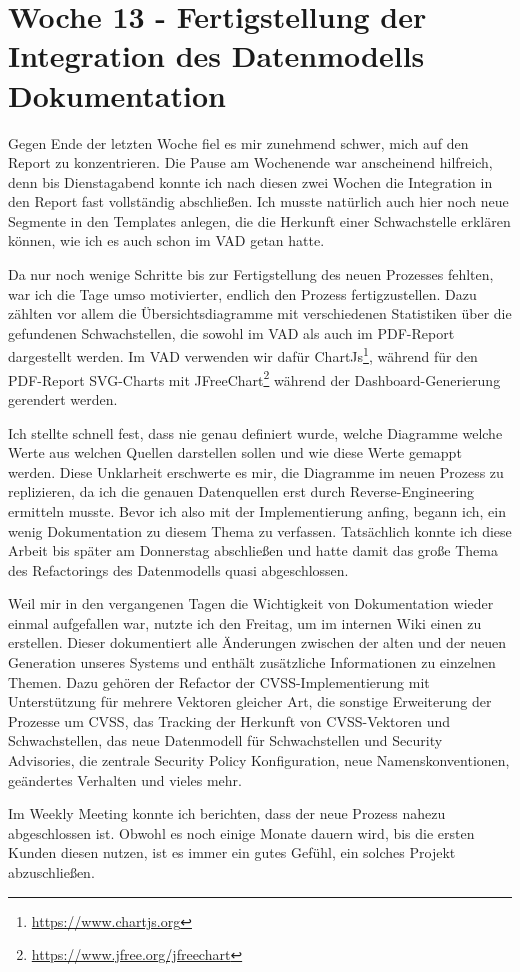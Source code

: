 \section{Woche 13 - Fertigstellung der Integration des Datenmodells \headerand Dokumentation} \label{sec:bericht-wo-13-initial}


\lweekdaymarginpar{\weekdayMondayShort, \weekdayTuesdayShort}

Gegen Ende der letzten Woche fiel es mir zunehmend schwer, mich auf den Report zu konzentrieren.
Die Pause am Wochenende war anscheinend hilfreich, denn bis Dienstagabend konnte ich nach diesen zwei Wochen die Integration in den Report fast vollständig abschließen.
Ich musste natürlich auch hier noch neue Segmente in den Templates anlegen, die die Herkunft einer Schwachstelle erklären können, wie ich es auch schon im VAD getan hatte.

\sweekdaymarginpar{\weekdayWednesdayShort, \weekdayThursdayShort}

Da nur noch wenige Schritte bis zur Fertigstellung des neuen Prozesses fehlten, war ich die Tage umso motivierter, endlich den Prozess fertigzustellen.
Dazu zählten vor allem die Übersichtsdiagramme mit verschiedenen Statistiken über die gefundenen Schwachstellen, die sowohl im VAD als auch im PDF-Report dargestellt werden.
Im VAD verwenden wir dafür ChartJs\footnote{\url{https://www.chartjs.org}}, während für den PDF-Report SVG-Charts mit JFreeChart\footnote{\url{https://www.jfree.org/jfreechart}} während der Dashboard-Generierung gerendert werden.

Ich stellte schnell fest, dass nie genau definiert wurde, welche Diagramme welche Werte aus welchen Quellen darstellen sollen und wie diese Werte gemappt werden.
Diese Unklarheit erschwerte es mir, die Diagramme im neuen Prozess zu replizieren, da ich die genauen Datenquellen erst durch Reverse-Engineering ermitteln musste.
Bevor ich also mit der Implementierung anfing, begann ich, ein wenig Dokumentation zu diesem Thema zu verfassen.
Tatsächlich konnte ich diese Arbeit bis später am Donnerstag abschließen und hatte damit das große Thema des Refactorings des Datenmodells quasi abgeschlossen.

\sweekdaymarginpar{\weekdayFridayLong}

Weil mir in den vergangenen Tagen die Wichtigkeit von Dokumentation wieder einmal aufgefallen war, nutzte ich den Freitag, um im internen Wiki einen  zu erstellen.
Dieser dokumentiert alle Änderungen zwischen der alten und der neuen Generation unseres Systems und enthält zusätzliche Informationen zu einzelnen Themen.
Dazu gehören der Refactor der CVSS-Implementierung mit Unterstützung für mehrere Vektoren gleicher Art, die sonstige Erweiterung der Prozesse um CVSS, das Tracking der Herkunft von CVSS-Vektoren und Schwachstellen, das neue Datenmodell für Schwachstellen und Security Advisories, die zentrale Security Policy Konfiguration, neue Namenskonventionen, geändertes Verhalten und vieles mehr.

Im Weekly Meeting konnte ich berichten, dass der neue Prozess nahezu abgeschlossen ist.
Obwohl es noch einige Monate dauern wird, bis die ersten Kunden diesen nutzen, ist es immer ein gutes Gefühl, ein solches Projekt abzuschließen.
